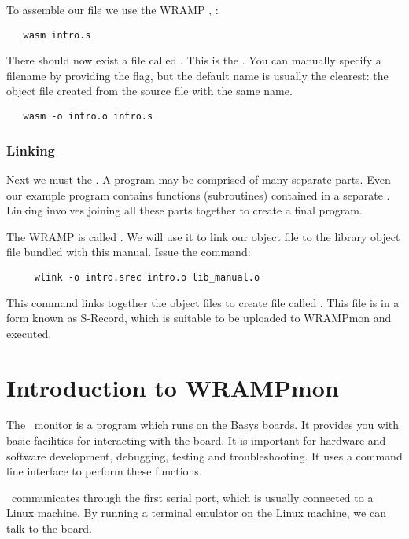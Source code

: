 To assemble our file we use the WRAMP , :
\begin{verbatim}
   wasm intro.s
\end{verbatim}

There should now exist a file called . This is the 
. You can manually specify a filename by providing the
 flag, but the default name is usually the clearest: the
object file created from the source file with the same name.

\begin{verbatim}
   wasm -o intro.o intro.s
\end{verbatim}

\subsubsection{Linking}
Next we must  the . A program may be
comprised of many separate parts. Even our example program contains
functions (subroutines) contained in a separate . Linking
involves joining all these parts together to create a final program.

The WRAMP  is called . We will use it to
link our object file to the library object file bundled with this manual.
Issue the command:
\begin{verbatim}
     wlink -o intro.srec intro.o lib_manual.o
\end{verbatim}

This command links together the object files to create file called
. This file is in a form known as S-Record, which
is suitable to be uploaded to WRAMPmon and executed.

%
%
%
\section{Introduction to WRAMPmon}
\label{intro:wrampmon}

The \WRAMPmon\ monitor is a program which runs on the Basys boards. It
provides you with basic facilities for interacting with the board.
It is important for hardware and software development, debugging,
testing and troubleshooting. It uses a command line interface to
perform these functions.

\WRAMPmon\ communicates through the first serial port, which is usually
connected to a Linux machine.
By running a terminal emulator on the Linux machine, we can talk to the board.

